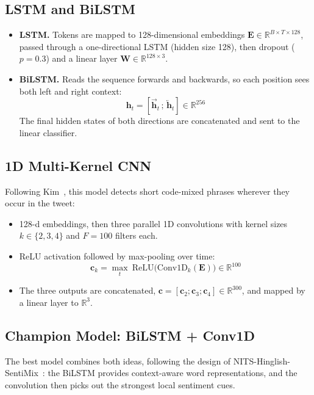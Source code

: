 \documentclass[11pt,a4paper]{article}
\begin{document}
\subsection{LSTM and BiLSTM}
\begin{itemize}
    \item \textbf{LSTM.} Tokens are mapped to 128-dimensional embeddings $\mathbf{E}\in\mathbb{R}^{B\times T\times128}$, passed through a one-directional LSTM (hidden size 128), then dropout ($p=0.3$) and a linear layer $\mathbf{W}\in\mathbb{R}^{128\times3}$.
    \item \textbf{BiLSTM.} Reads the sequence forwards and backwards, so each position sees both left and right context:
    \begin{equation}
        \mathbf{h}_t = \left[\overrightarrow{\mathbf{h}}_t \,;\, \overleftarrow{\mathbf{h}}_t\right] \in \mathbb{R}^{256}
    \end{equation}
    The final hidden states of both directions are concatenated and sent to the linear classifier.
\end{itemize}

\subsection{1D Multi-Kernel CNN}
Following Kim~\cite{kim2014convolutional}, this model detects short code-mixed phrases wherever they occur in the tweet:
\begin{itemize}
    \item 128-d embeddings, then three parallel 1D convolutions with kernel sizes $k\in\{2,3,4\}$ and $F=100$ filters each.
    \item ReLU activation followed by max-pooling over time:
    \begin{equation}
        \mathbf{c}_k = \max_{t}\ \text{ReLU}\big(\text{Conv1D}_k(\mathbf{E})\big) \in \mathbb{R}^{100}
    \end{equation}
    \item The three outputs are concatenated, $\mathbf{c}=[\mathbf{c}_2;\mathbf{c}_3;\mathbf{c}_4]\in\mathbb{R}^{300}$, and mapped by a linear layer to $\mathbb{R}^3$.
\end{itemize}

\subsection{Champion Model: BiLSTM + Conv1D}
The best model combines both ideas, following the design of NITS-Hinglish-SentiMix~\cite{singh2020nits}: the BiLSTM provides context-aware word representations, and the convolution then picks out the strongest local sentiment cues.
\end{document}
